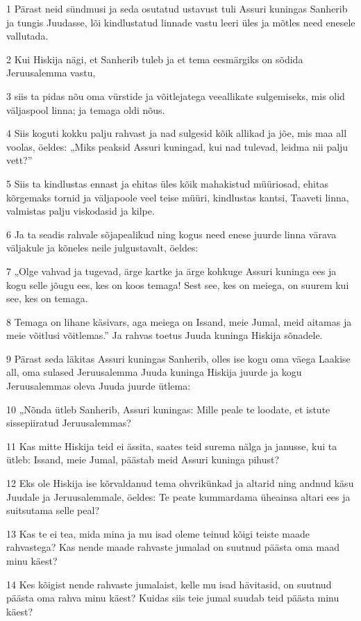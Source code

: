 \par 1 Pärast neid sündmusi ja seda osutatud ustavust tuli Assuri kuningas Sanherib ja tungis Juudasse, lõi kindlustatud linnade vastu leeri üles ja mõtles need enesele vallutada.
\par 2 Kui Hiskija nägi, et Sanherib tuleb ja et tema eesmärgiks on sõdida Jeruusalemma vastu,
\par 3 siis ta pidas nõu oma vürstide ja võitlejatega veeallikate sulgemiseks, mis olid väljaspool linna; ja temaga oldi nõus.
\par 4 Siis koguti kokku palju rahvast ja nad sulgesid kõik allikad ja jõe, mis maa all voolas, öeldes: „Miks peaksid Assuri kuningad, kui nad tulevad, leidma nii palju vett?”
\par 5 Siis ta kindlustas ennast ja ehitas üles kõik mahakistud müüriosad, ehitas kõrgemaks tornid ja väljapoole veel teise müüri, kindlustas kantsi, Taaveti linna, valmistas palju viskodasid ja kilpe.
\par 6 Ja ta seadis rahvale sõjapealikud ning kogus need enese juurde linna värava väljakule ja kõneles neile julgustavalt, öeldes:
\par 7 „Olge vahvad ja tugevad, ärge kartke ja ärge kohkuge Assuri kuninga ees ja kogu selle jõugu ees, kes on koos temaga! Sest see, kes on meiega, on suurem kui see, kes on temaga.
\par 8 Temaga on lihane käsivars, aga meiega on Issand, meie Jumal, meid aitamas ja meie võitlusi võitlemas.” Ja rahvas toetus Juuda kuninga Hiskija sõnadele.
\par 9 Pärast seda läkitas Assuri kuningas Sanherib, olles ise kogu oma väega Laakise all, oma sulased Jeruusalemma Juuda kuninga Hiskija juurde ja kogu Jeruusalemmas oleva Juuda juurde ütlema:
\par 10 „Nõnda ütleb Sanherib, Assuri kuningas: Mille peale te loodate, et istute sissepiiratud Jeruusalemmas?
\par 11 Kas mitte Hiskija teid ei ässita, saates teid surema nälga ja janusse, kui ta ütleb: Issand, meie Jumal, päästab meid Assuri kuninga pihust?
\par 12 Eks ole Hiskija ise kõrvaldanud tema ohvrikünkad ja altarid ning andnud käsu Juudale ja Jeruusalemmale, öeldes: Te peate kummardama üheainsa altari ees ja suitsutama selle peal?
\par 13 Kas te ei tea, mida mina ja mu isad oleme teinud kõigi teiste maade rahvastega? Kas nende maade rahvaste jumalad on suutnud päästa oma maad minu käest?
\par 14 Kes kõigist nende rahvaste jumalaist, kelle mu isad hävitasid, on suutnud päästa oma rahva minu käest? Kuidas siis teie jumal suudab teid päästa minu käest?
